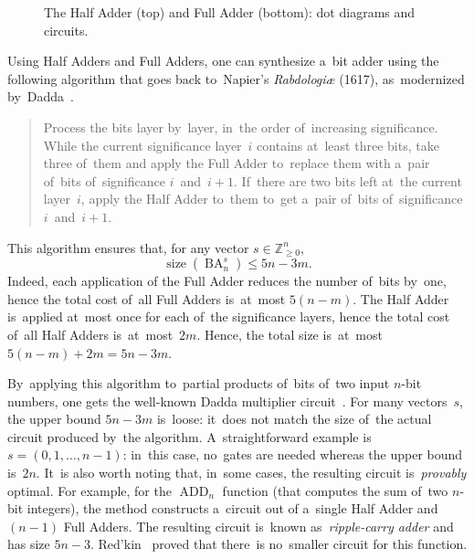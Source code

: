 \documentclass[sigconf, review, anonymous]{acmart}
\DeclareMathOperator{\ADD}{ADD}
\DeclareMathOperator{\BA}{BA}
\begin{document}
\begin{figure}
\begin{center}
    \end{center}
    \caption{The Half Adder (top) and Full Adder (bottom): dot diagrams and circuits.}
    \label{figure:sum23}
\end{figure}


Using Half Adders and Full Adders, one can synthesize a~bit adder using the following algorithm that goes back to~Napier's \emph{Rabdologiæ} (1617),
as~modernized by~Dadda~\cite{dadda}.
\begin{quote}
	Process the bits layer by~layer, in~the order of~increasing significance.
	While the current significance layer~$i$ contains at~least three bits,
	take three of~them and apply the Full Adder to~replace them with a~pair of~bits
	of~significance $i$~and~$i+1$. If~there are two bits left at~the current layer~$i$, apply the Half Adder to~them to~get a~pair of~bits of~significance $i$~and~$i+1$.
\end{quote}
This algorithm ensures that, for any vector $s \in \mathbb{Z}_{\ge 0}^n$,
\[\operatorname{size}(\BA_n^s) \le 5n-3m.\]
Indeed, each application of the Full Adder reduces the number of~bits by~one,
hence the total cost of~all Full Adders is~at~most $5(n-m)$. The Half Adder is~applied at~most once for each of~the significance layers, hence
the total cost of~all Half Adders is~at~most~$2m$. Hence, the total size
is~at~most $5(n-m)+2m=5n-3m$.

By~applying this algorithm to~partial products of~bits of~two input $n$-bit numbers, one gets the well-known Dadda multiplier circuit~\cite{dadda}.
For many vectors~$s$, the upper bound
$5n-3m$ is~loose:
it~does not match the size of~the actual circuit
produced by~the algorithm.
A~straightforward example is $s=(0,1,\dotsc,n-1)$:
in~this case, no~gates are needed whereas the upper bound is~$2n$.
It~is also worth noting that, in~some cases, the resulting circuit
is~\emph{provably} optimal.
For example, for the $\ADD_n$ function (that computes the sum of~two $n$-bit integers),
the method constructs a~circuit out of a~single Half Adder and $(n-1)$
Full Adders. The resulting circuit is~known as~\emph{ripple-carry adder} and has size $5n-3$.
Red'kin~\cite{Red81} proved that there~is no~smaller circuit
for this function.
\end{document}
